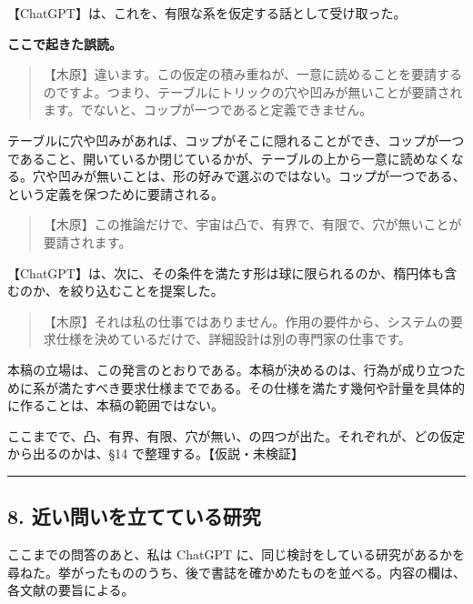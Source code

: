 \documentclass[
  a4paper,
]{ltjsarticle}
\begin{document}
【ChatGPT】は、これを、有限な系を仮定する話として受け取った。

\textbf{ここで起きた誤読。}

\begin{quote}
【木原】違います。この仮定の積み重ねが、一意に読めることを要請するのですよ。つまり、テーブルにトリックの穴や凹みが無いことが要請されます。でないと、コップが一つであると定義できません。
\end{quote}

テーブルに穴や凹みがあれば、コップがそこに隠れることができ、コップが一つであること、開いているか閉じているかが、テーブルの上から一意に読めなくなる。穴や凹みが無いことは、形の好みで選ぶのではない。コップが一つである、という定義を保つために要請される。

\begin{quote}
【木原】この推論だけで、宇宙は凸で、有界で、有限で、穴が無いことが要請されます。
\end{quote}

【ChatGPT】は、次に、その条件を満たす形は球に限られるのか、楕円体も含むのか、を絞り込むことを提案した。

\begin{quote}
【木原】それは私の仕事ではありません。作用の要件から、システムの要求仕様を決めているだけで、詳細設計は別の専門家の仕事です。
\end{quote}

本稿の立場は、この発言のとおりである。本稿が決めるのは、行為が成り立つために系が満たすべき要求仕様までである。その仕様を満たす幾何や計量を具体的に作ることは、本稿の範囲ではない。

ここまでで、凸、有界、有限、穴が無い、の四つが出た。それぞれが、どの仮定から出るのかは、§14
で整理する。【仮説・未検証】

\begin{center}\rule{0.5\linewidth}{0.5pt}\end{center}

\subsection{8.
近い問いを立てている研究}\label{ux8fd1ux3044ux554fux3044ux3092ux7acbux3066ux3066ux3044ux308bux7814ux7a76}

ここまでの問答のあと、私は ChatGPT
に、同じ検討をしている研究があるかを尋ねた。挙がったもののうち、後で書誌を確かめたものを並べる。内容の欄は、各文献の要旨による。
\end{document}
